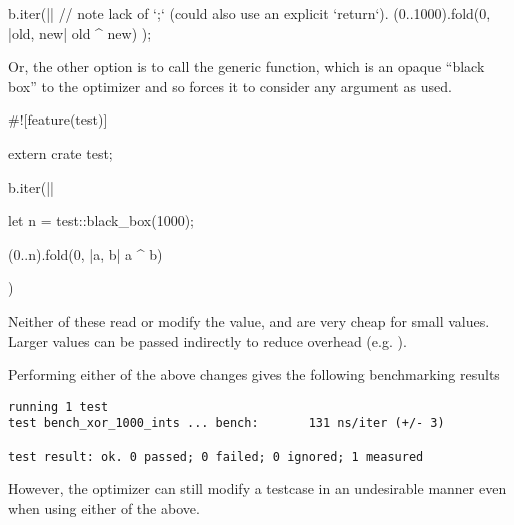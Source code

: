\begin{rustc}
b.iter(|| {
    // note lack of `;` (could also use an explicit `return`).
    (0..1000).fold(0, |old, new| old ^ new)
});
\end{rustc}

Or, the other option is to call the generic  function, which is an opaque \enquote{black box} to the 
optimizer and so forces it to consider any argument as used.

\begin{rustc}
#![feature(test)]

extern crate test;

b.iter(|| {
    let n = test::black_box(1000);

    (0..n).fold(0, |a, b| a ^ b)
})
\end{rustc}

Neither of these read or modify the value, and are very cheap for small values. Larger values can be passed indirectly to 
reduce overhead (e.g. ).

\blank

Performing either of the above changes gives the following benchmarking results

\begin{verbatim}
running 1 test
test bench_xor_1000_ints ... bench:       131 ns/iter (+/- 3)

test result: ok. 0 passed; 0 failed; 0 ignored; 1 measured
\end{verbatim}

However, the optimizer can still modify a testcase in an undesirable manner even when using either of the above.
